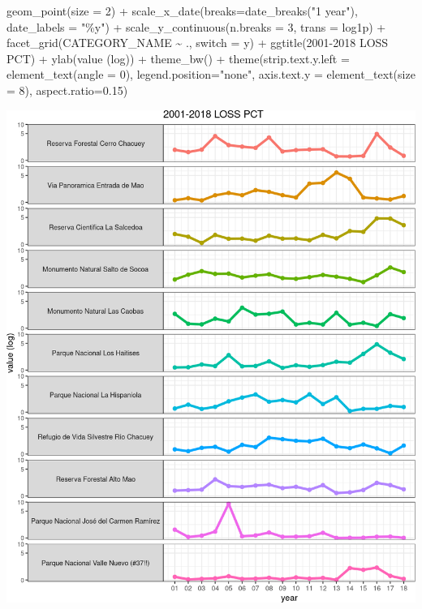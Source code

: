 \documentclass[10pt,landscape,a3paper]{article}
\newenvironment{Shaded}{\begin{snugshade}}{\end{snugshade}}
\newcommand{\AttributeTok}[1]{\textcolor[rgb]{0.77,0.63,0.00}{#1}}
\newcommand{\DecValTok}[1]{\textcolor[rgb]{0.00,0.00,0.81}{#1}}
\newcommand{\FloatTok}[1]{\textcolor[rgb]{0.00,0.00,0.81}{#1}}
\newcommand{\FunctionTok}[1]{\textcolor[rgb]{0.00,0.00,0.00}{#1}}
\newcommand{\NormalTok}[1]{#1}
\newcommand{\SpecialCharTok}[1]{\textcolor[rgb]{0.00,0.00,0.00}{#1}}
\newcommand{\StringTok}[1]{\textcolor[rgb]{0.31,0.60,0.02}{#1}}
\begin{document}
\begin{Shaded}
\begin{Highlighting}[]
  \FunctionTok{geom\_point}\NormalTok{(}\AttributeTok{size =} \DecValTok{2}\NormalTok{) }\SpecialCharTok{+} 
  \FunctionTok{scale\_x\_date}\NormalTok{(}\AttributeTok{breaks=}\FunctionTok{date\_breaks}\NormalTok{(}\StringTok{"1 year"}\NormalTok{), }\AttributeTok{date\_labels =} \StringTok{"\%y"}\NormalTok{) }\SpecialCharTok{+} 
  \FunctionTok{scale\_y\_continuous}\NormalTok{(}\AttributeTok{n.breaks =} \DecValTok{3}\NormalTok{, }\AttributeTok{trans =} \StringTok{\textquotesingle{}log1p\textquotesingle{}}\NormalTok{) }\SpecialCharTok{+}
  \FunctionTok{facet\_grid}\NormalTok{(CATEGORY\_NAME }\SpecialCharTok{\textasciitilde{}}\NormalTok{ ., }\AttributeTok{switch =} \StringTok{\textquotesingle{}y\textquotesingle{}}\NormalTok{) }\SpecialCharTok{+}
  \FunctionTok{ggtitle}\NormalTok{(}\StringTok{\textquotesingle{}2001{-}2018 LOSS PCT\textquotesingle{}}\NormalTok{) }\SpecialCharTok{+}
  \FunctionTok{ylab}\NormalTok{(}\StringTok{\textquotesingle{}value (log)\textquotesingle{}}\NormalTok{) }\SpecialCharTok{+}
  \FunctionTok{theme\_bw}\NormalTok{() }\SpecialCharTok{+}
  \FunctionTok{theme}\NormalTok{(}\AttributeTok{strip.text.y.left =} \FunctionTok{element\_text}\NormalTok{(}\AttributeTok{angle =} \DecValTok{0}\NormalTok{), }\AttributeTok{legend.position=}\StringTok{"none"}\NormalTok{,}
        \AttributeTok{axis.text.y =} \FunctionTok{element\_text}\NormalTok{(}\AttributeTok{size =} \DecValTok{8}\NormalTok{), }\AttributeTok{aspect.ratio=}\FloatTok{0.15}\NormalTok{)}
\end{Highlighting}
\end{Shaded}

\begin{center}\includegraphics{img/data-download-preparation-eda/zonal-pa-3} \end{center}
\end{document}
